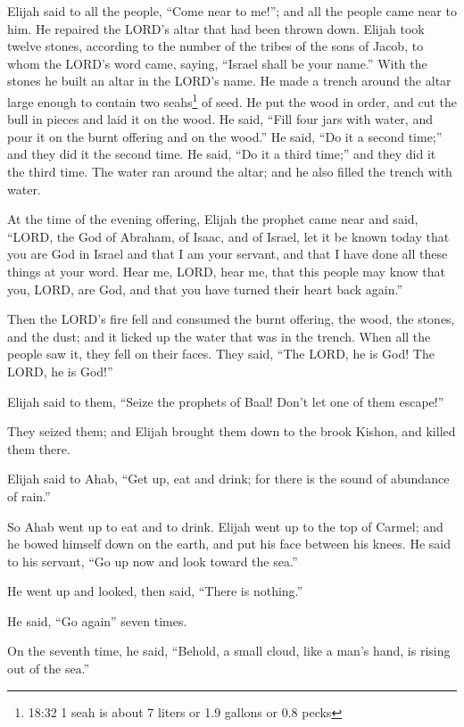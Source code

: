 \myverse{}Elijah said to all the people, “Come near to me!”; and all the
people came near to him. He repaired the LORD’s altar that had been thrown down.
\myverse{}Elijah took twelve stones, according to the number of the tribes of the sons
of Jacob, to whom the LORD’s word came, saying, “Israel shall be your name.”
\myverse{}With the stones he built an altar in the LORD’s name. He made a trench around
the altar large enough to contain two seahs\footnote{18:32 1 seah is about 7 liters or 1.9 gallons or 0.8 pecks} of seed.
\myverse{}He put the wood in order, and cut the bull in pieces and laid it on the wood.
He said, “Fill four jars with water, and pour it on the burnt offering and on the wood.”
\myverse{}He said, “Do it a second time;” and they did it the second time. He said,
“Do it a third time;” and they did it the third time.
\myverse{}The water ran around the altar; and he also filled the trench with water.

\myverse{}At the time of the evening offering, Elijah the prophet came
near and said, “LORD, the God of Abraham, of Isaac, and of Israel, let it be known today that you are
God in Israel and that I am your servant, and that I have done all these things at your word.
\myverse{}Hear me, LORD, hear me, that this people may know that you, LORD, are God,
and that you have turned their heart back again.”

\myverse{}Then the LORD’s fire fell and consumed the burnt offering, the
wood, the stones, and the dust; and it licked up the water that was in the trench.
\myverse{}When all the people saw it, they fell on their faces. They said, “The LORD,
he is God! The LORD, he is God!”

\myverse{}Elijah said to them, “Seize the prophets of Baal! Don’t let
one of them escape!”

They seized them; and Elijah brought them down to the brook Kishon, and killed them there.

\myverse{}Elijah said to Ahab, “Get up, eat and drink; for there is the
sound of abundance of rain.”

\myverse{}So Ahab went up to eat and to drink. Elijah went up to the top
of Carmel; and he bowed himself down on the earth, and put his face between his knees.
\myverse{}He said to his servant, “Go up now and look toward the sea.”

He went up and looked, then said, “There is nothing.”

He said, “Go again” seven times.

\myverse{}On the seventh time, he said, “Behold, a small cloud, like a
man’s hand, is rising out of the sea.”

